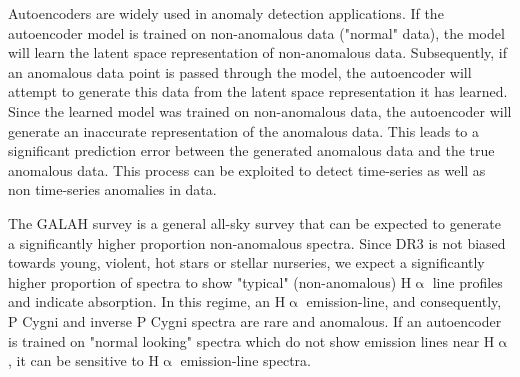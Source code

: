 Autoencoders are widely used in anomaly detection applications\cite{sakurada2014anomaly}. If the autoencoder model is trained on non-anomalous data ("normal" data), the model will learn the latent space representation of non-anomalous data. Subsequently, if an anomalous data point is passed through the model, the autoencoder will attempt to generate this data from the latent space representation it has learned. Since the learned model was trained on non-anomalous data, the autoencoder will generate an inaccurate representation of the anomalous data. This leads to a significant prediction error between the generated anomalous data and the true anomalous data. This process can be exploited to detect time-series as well as non time-series anomalies in data.

The GALAH survey is a general all-sky survey that can be expected to generate a significantly higher proportion non-anomalous spectra. Since DR3 is not biased towards young, violent, hot stars or stellar nurseries, we expect a significantly higher proportion of spectra to show "typical" (non-anomalous) H$\upalpha$ line profiles and indicate absorption. In this regime, an H$\upalpha$ emission-line, and consequently, P Cygni and inverse P Cygni spectra are rare and anomalous. If an autoencoder is trained on "normal looking" spectra which do not show emission lines near H$\upalpha$, it can be sensitive to H$\upalpha$ emission-line spectra. 

